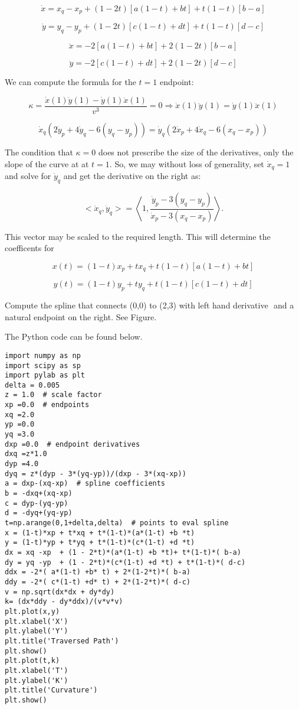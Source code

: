 \[\dot{x} = x_q -x_p  + (1 - 2t)\left[ a(1-t) +b t\right] + t(1-t)\left[ b-a\right]\]

\[\dot{y} =   y_q -y_p  + (1 - 2t)\left[ c(1-t) +d t\right] + t(1-t)\left[ d-c\right]\]

\[\ddot{x} = -2\left[ a(1-t) +b t\right] + 2(1-2t)\left[ b-a\right]\]

\[\ddot{y} = -2\left[ c(1-t) +d t\right] + 2(1-2t)\left[ d-c\right]\]

We can compute the formula for the \(t=1\) endpoint:

\[\kappa =   \displaystyle  \frac{\dot{x}(1)\ddot{y}(1) - \dot{y}(1)\ddot{x}(1)}{v^3} = 0 \Rightarrow   \dot{x}(1)\ddot{y}(1) = \dot{y}(1)\ddot{x}(1)\]

\[\dot{x}_q (2\dot{y}_p + 4\dot{y}_q - 6(y_q-y_p)) = \dot{y}_q (2\dot{x}_p + 4\dot{x}_q- 6(x_q-x_p))\]

The condition that \(\kappa = 0\) does not prescribe the size of the
derivatives, only the slope of the curve at at \(t=1\). So, we may
without loss of generality, set \(\dot{x}_q = 1\) and solve for
\(\dot{y}_q\) and get the derivative on the right as:

\[<\dot{x}_q,\dot{y}_q> = \left< 1, \frac{ \dot{y}_p - 3(y_q-y_p)}{\dot{x}_p - 3(x_q-x_p) } \right>.\]

This vector may be scaled to the required length. This will determine
the coefficents for

\[x(t) = (1-t)x_p + t x_q + t(1-t)\left[ a(1-t) +b t\right]\]

\[y(t) = (1-t)y_p + t y_q + t(1-t)\left[ c(1-t) +d t\right]\]

Compute the spline that connects (0,0) to (2,3) with left hand
derivative \(<0,1>\) and a natural endpoint on the right. See Figure.

The Python code can be found below.

\hypertarget{lst:spline}{%
\label{lst:spline}}%
\begin{verbatim}
import numpy as np
import scipy as sp
import pylab as plt
delta = 0.005
z = 1.0  # scale factor
xp =0.0  # endpoints
xq =2.0
yp =0.0
yq =3.0
dxp =0.0  # endpoint derivatives
dxq =z*1.0
dyp =4.0
dyq = z*(dyp - 3*(yq-yp))/(dxp - 3*(xq-xp))
a = dxp-(xq-xp)  # spline coefficients
b = -dxq+(xq-xp)
c = dyp-(yq-yp)
d = -dyq+(yq-yp)
t=np.arange(0,1+delta,delta)  # points to eval spline
x = (1-t)*xp + t*xq + t*(1-t)*(a*(1-t) +b *t)
y = (1-t)*yp + t*yq + t*(1-t)*(c*(1-t) +d *t)
dx = xq -xp  + (1 - 2*t)*(a*(1-t) +b *t)+ t*(1-t)*( b-a)
dy = yq -yp  + (1 - 2*t)*(c*(1-t) +d *t) + t*(1-t)*( d-c)
ddx = -2*( a*(1-t) +b* t) + 2*(1-2*t)*( b-a)
ddy = -2*( c*(1-t) +d* t) + 2*(1-2*t)*( d-c)
v = np.sqrt(dx*dx + dy*dy)
k= (dx*ddy - dy*ddx)/(v*v*v)
plt.plot(x,y)
plt.xlabel('X')
plt.ylabel('Y')
plt.title('Traversed Path')
plt.show()
plt.plot(t,k)
plt.xlabel('T')
plt.ylabel('K')
plt.title('Curvature')
plt.show()
\end{verbatim}

